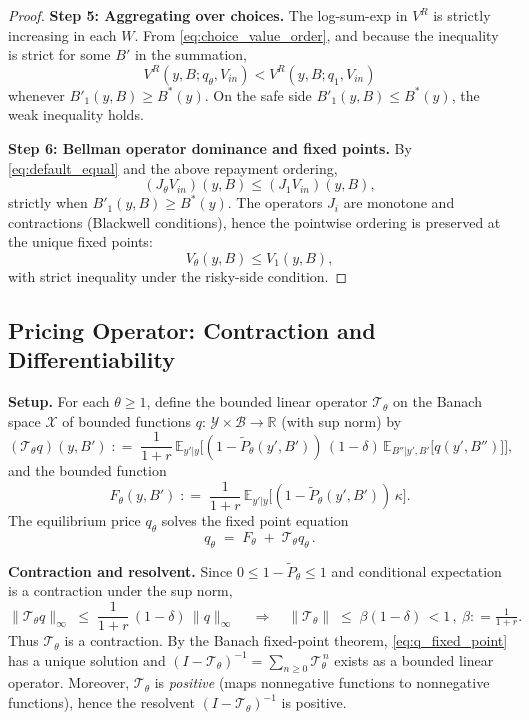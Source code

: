 \documentclass[12pt]{article}
\providecommand{\coloneqq}{\mathrel{\mathop:}=}
\theoremstyle{plain}
\newcommand{\E}{\mathbb{E}}
\newcommand{\Y}{\mathcal{Y}}
\begin{document}
\begin{proof}
	\medskip
	\textbf{Step 5: Aggregating over choices.}
	The log-sum-exp in $V^R$ is strictly increasing in each $W$.
	From \eqref{eq:choice_value_order}, and because the inequality is strict for some $B'$ in the summation,
	\[
		V^R(y,B;q_\theta,V_{in}) < V^R(y,B;q_1,V_{in})
	\]
	whenever $B'_1(y,B)\ge B^*(y)$. On the safe side $B'_1(y,B)\le B^*(y)$, the
	weak inequality holds.

	\medskip
	\textbf{Step 6: Bellman operator dominance and fixed points.}
	By \eqref{eq:default_equal} and the above repayment ordering,
	\[
		(J_\theta V_{in})(y,B) \le (J_1V_{in})(y,B),
	\]
	strictly when $B'_1(y,B)\ge B^*(y)$. The operators $J_i$ are monotone and
	contractions (Blackwell conditions), hence the pointwise ordering is preserved
	at the unique fixed points:
	\[
		V_\theta(y,B) \le V_1(y,B),
	\]
	with strict inequality under the risky-side condition.

\end{proof}

\subsection{Pricing Operator: Contraction and Differentiability}\label{app:operator_analysis}
\textbf{Setup.} For each \(\theta\ge 1\), define the bounded linear operator \(\mathcal T_\theta\) on the Banach space \(\mathcal X\) of bounded functions \(q:\,\Y\times\mathcal B\to\mathbb R\) (with sup norm) by
\begin{equation}\label{eq:Ttheta_def}
	(\mathcal T_\theta q)(y,B')\;\coloneqq\;\frac{1}{1+r}\,\E_{y'|y}\Big[(1-\tilde P_\theta(y',B'))\,(1-\delta)\,\E_{B''|y',B'}\big[q(y',B'')\big]\Big],
\end{equation}
and the bounded function
\begin{equation}\label{eq:Ftheta_def}
	F_\theta(y,B')\;\coloneqq\;\frac{1}{1+r}\,\E_{y'|y}\Big[(1-\tilde P_\theta(y',B'))\,\kappa\Big].
\end{equation}
The equilibrium price \(q_\theta\) solves the fixed point equation
\begin{equation}\label{eq:q_fixed_point}
	q_\theta\;=\;F_\theta\;+\;\mathcal T_\theta q_\theta\,.
\end{equation}

\textbf{Contraction and resolvent.} Since \(0\le 1-\tilde P_\theta\le 1\) and conditional expectation is a contraction under the sup norm,
\begin{equation}\label{eq:Ttheta_norm}
	\|\mathcal T_\theta q\|_\infty\;\le\;\frac{1}{1+r}\,(1-\delta)\,\|q\|_\infty\,\quad\Rightarrow\quad\|\mathcal T_\theta\|\;\le\;\beta(1-\delta)\,<1\,,\ \beta\coloneqq\tfrac{1}{1+r}.
\end{equation}
Thus \(\mathcal T_\theta\) is a contraction. By the Banach fixed-point theorem, \eqref{eq:q_fixed_point} has a unique solution and
\((I-\mathcal T_\theta)^{-1}=\sum_{n\ge 0}\mathcal T_\theta^{\,n}\) exists as a bounded linear operator. Moreover, \(\mathcal T_\theta\) is \emph{positive} (maps nonnegative functions to nonnegative functions), hence the resolvent \((I-\mathcal T_\theta)^{-1}\) is positive.
\end{document}
